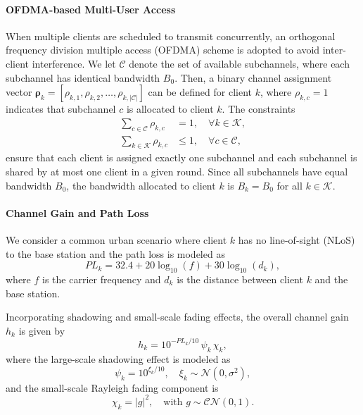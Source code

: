 \documentclass[journal]{IEEEtran}
\begin{document}
\paragraph{OFDMA-based Multi-User Access}  
When multiple clients are scheduled to transmit concurrently, an orthogonal frequency division multiple access (OFDMA) scheme is adopted to avoid inter-client interference. We let $\mathcal{C}$ denote the set of available subchannels, where each subchannel has identical bandwidth $B_0$. Then, a binary channel assignment vector $\boldsymbol{\rho}_k = [\rho_{k,1}, \rho_{k,2}, \ldots, \rho_{k,|\mathcal{C}|}]$ can be defined for client $k$, where $\rho_{k,c}=1$ indicates that subchannel $c$ is allocated to client $k$. The constraints 
\begin{align}
    \sum_{c\in\mathcal{C}} \rho_{k,c} &= 1, \quad \forall k \in \mathcal{K}, \label{eq:assign1}\\
    \sum_{k\in\mathcal{K}} \rho_{k,c} &\le 1, \quad \forall c \in \mathcal{C}, \label{eq:assign2}
\end{align}
ensure that each client is assigned exactly one subchannel and each subchannel is shared by at most one client in a given round.
Since all subchannels have equal bandwidth \( B_0 \), the bandwidth allocated to client \( k \) is \( B_k = B_0 \) for all \( k \in \mathcal{K} \).




\paragraph{Channel Gain and Path Loss}  
We consider a common urban scenario where client \( k \) has no line-of-sight (NLoS) to the base station\cite{3gpp_tr_38_901_v16_1_0} and the path loss is modeled as  
\begin{equation}
    PL_k = 32.4 + 20\log_{10}(f) + 30\log_{10}(d_k),
    \label{eq:pl}
\end{equation}
where \( f \)  is the carrier frequency and \( d_k \) is the distance between client \( k \) and the base station.  

Incorporating shadowing and small-scale fading effects, the overall channel gain \( h_k \) is given by  
\begin{equation}
    h_k = 10^{-PL_k/10} \, \psi_k \, \chi_k,
    \label{eq:channel_gain}
\end{equation}
where the large-scale shadowing effect is modeled as  
\begin{equation}
\psi_k = 10^{\xi_k/10}, \quad \xi_k \sim \mathcal{N}(0, \sigma^2),
\end{equation}
and the small-scale Rayleigh fading component is  
\begin{equation}
\chi_k = |g|^2, \quad \text{with } g \sim \mathcal{CN}(0,1).
\end{equation}
\end{document}
